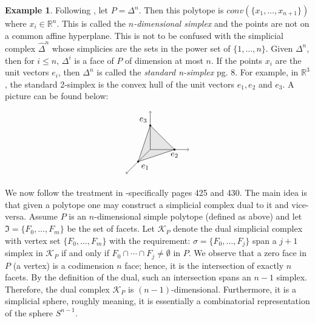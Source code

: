 \documentclass[oneside,12pt]{amsart}
\theoremstyle{definition}
\newtheorem{Example}[Theorem]{Example}
\numberwithin{equation}{section}
\begin{document}
\begin{Example}

Following \cite{BP1}, let $P = \Delta^n$. Then this polytope is $conv( \{x_1,\ldots,x_{n+1} \} )$ where $x_i \in \mathbb{R}^n$.  This is called the \textit{$n$-dimensional simplex} and the points are not on a common affine hyperplane.  This is not to be confused with the simplicial complex $\widehat{\Delta}^n$ whose simplicies are the sets in the power set of $\{1,\ldots,n\}$.  Given $\Delta^n$, then for $i \leq n$, $\Delta^i$ is a face of $P$ of dimension at most $n$. If the points $x_i$ are the unit vectors $e_i$, then $\Delta^n$ is called the \textit{standard n-simplex} \cite{BP1} pg. 8.  For example, in $\mathbb{R}^3$, the standard 2-simplex is the convex hull of the unit vectors $e_1, e_2$ and $e_3$.  A picture can be found below:\\

\begin{minipage}{\linewidth}
$$\begin{tikzpicture}
\filldraw[color=gray!20] (1,0)--(0,1)--(-.5,-.5)--(1,0);
\draw[->] (0,0)--(1.6,0);
\draw[->] (0,0)--(0,1.6);
\draw[->] (0,0)--(-1,-1);
\draw (1,0)--(0,1)--(-.5,-.5)--(1,0);
\filldraw[black] (1,0) node[below=.1pt]{$e_2$} circle (1pt);
\filldraw[black] (0,1) node[above left=.1pt]{$e_3$} circle (1pt);
\filldraw[black] (-.5,-.5) node[below right=.1pt]{$e_1$} circle (1pt);
\end{tikzpicture}$$
        \end{minipage}%
\end{Example}

We now follow the treatment in \cite{DJ}-specifically pages 425 and 430.  The main idea is that given a polytope one may construct a simplicial complex dual to it and vice-versa.  Assume $P$ is an $n$-dimensional simple polytope (defined as above) and let $\Im = \{F_0,\ldots,F_m\}$ be the set of facets.  Let $\mathcal{K}_P$ denote the dual simplicial complex with vertex set $\{F_0,\ldots,F_m\}$ with the requirement:  $\sigma = \{ F_0,\ldots,F_{j}\}$ span a $j+1$ simplex in $\mathcal{K}_P$ if and only if $ F_0 \cap \cdots \cap F_j \neq \emptyset$ in $P$.  We observe that a zero face in $P$ (a vertex) is a codimension $n$ face; hence, it is the intersection of exactly $n$ facets.  By the definition of the dual, such an intersection spans an $n-1$ simplex.  Therefore, the dual complex $\mathcal{K}_P$ is $(n-1)$-dimensional.  Furthermore, it is a simplicial sphere, roughly meaning, it is essentially a combinatorial representation of the sphere $S^{n-1}$.
\end{document}
